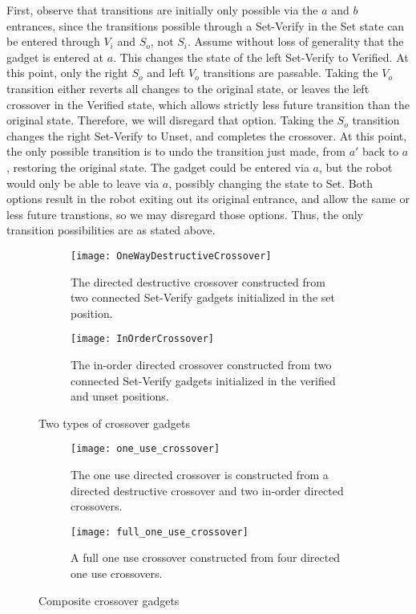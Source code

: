First, observe that transitions are initially only possible via the $a$ and $b$ entrances, since the transitions possible through a Set-Verify in the Set state can be entered through $V_i$ and $S_o$, not $S_i$. Assume without loss of generality that the gadget is entered at $a$. This changes the state of the left Set-Verify to Verified. At this point, only the right $S_o$ and left $V_o$ transitions are passable. Taking the $V_o$ transition either reverts all changes to the original state, or leaves the left crossover in the Verified state, which allows strictly less future transition than the original state. Therefore, we will disregard that option. Taking the $S_o$ transition changes the right Set-Verify to Unset, and completes the crossover. At this point, the only possible transition is to undo the transition just made, from $a'$ back to $a$, restoring the original state. The gadget could be entered via $a$, but the robot would only be able to leave via $a$, possibly changing the state to Set. Both options result in the robot exiting out its original entrance, and allow the same or less future transtions, so we may disregard those options. Thus, the only transition possibilities are as stated above.

\begin{figure}[!ht]
  \centering
  \begin{subfigure}[b]{0.47\textwidth}
    \texttt{[image: OneWayDestructiveCrossover]}
    \caption{The directed destructive crossover constructed from two connected Set-Verify gadgets initialized in the set position.}
    \label{DestructiveCrossover}
  \end{subfigure}
  \hfill
  \begin{subfigure}[b]{0.47\textwidth}
    \texttt{[image: InOrderCrossover]}
    \caption{The in-order directed crossover constructed from two connected Set-Verify gadgets initialized in the verified and unset positions.}
    \label{InOrderCrossover}
  \end{subfigure}
  \caption{Two types of crossover gadgets}
\end{figure}

\begin{figure}[!ht]
  \centering
  \begin{subfigure}[b]{0.48\textwidth}
    \texttt{[image: one\_use\_crossover]}
    \caption{The one use directed crossover is constructed from a directed destructive crossover and two in-order directed crossovers.}
    \label{OneUseCrossover}
  \end{subfigure}
  \hfill
  \begin{subfigure}[b]{0.43\textwidth}
    \texttt{[image: full\_one\_use\_crossover]}
    \caption{A full one use crossover constructed from four directed one use crossovers.}
    \label{full_one_use_crossover}
  \end{subfigure}
  \caption{Composite crossover gadgets}
\end{figure}

